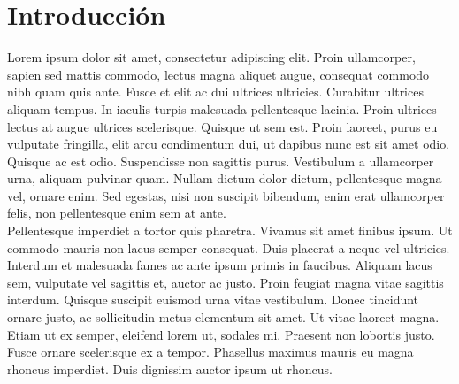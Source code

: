 \documentclass[letterpaper,oneside,openany,11pt]{book}
\begin{document}
\newpage
\tableofcontents %

\cleardoublepage
{} %
\listoffigures %

\cleardoublepage
{} %
\listoftables %



\chapter{Introducción}\label{cap.introduccion}
\noindent Lorem ipsum dolor sit amet, consectetur adipiscing elit. Proin ullamcorper, sapien sed mattis commodo, lectus magna aliquet augue, consequat commodo nibh quam quis ante. Fusce et elit ac dui ultrices ultricies. Curabitur ultrices aliquam tempus. In iaculis turpis malesuada pellentesque lacinia. Proin ultrices lectus at augue ultrices scelerisque. Quisque ut sem est. Proin laoreet, purus eu vulputate fringilla, elit arcu condimentum dui, ut dapibus nunc est sit amet odio. Quisque ac est odio. Suspendisse non sagittis purus. Vestibulum a ullamcorper urna, aliquam pulvinar quam. Nullam dictum dolor dictum, pellentesque magna vel, ornare enim. Sed egestas, nisi non suscipit bibendum, enim erat ullamcorper felis, non pellentesque enim sem at ante. \\

Pellentesque imperdiet a tortor quis pharetra. Vivamus sit amet finibus ipsum. Ut commodo mauris non lacus semper consequat. Duis placerat a neque vel ultricies. Interdum et malesuada fames ac ante ipsum primis in faucibus. Aliquam lacus sem, vulputate vel sagittis et, auctor ac justo. Proin feugiat magna vitae sagittis interdum. Quisque suscipit euismod urna vitae vestibulum. Donec tincidunt ornare justo, ac sollicitudin metus elementum sit amet. Ut vitae laoreet magna. Etiam ut ex semper, eleifend lorem ut, sodales mi. Praesent non lobortis justo. Fusce ornare scelerisque ex a tempor. Phasellus maximus mauris eu magna rhoncus imperdiet. Duis dignissim auctor ipsum ut rhoncus.
\end{document}
